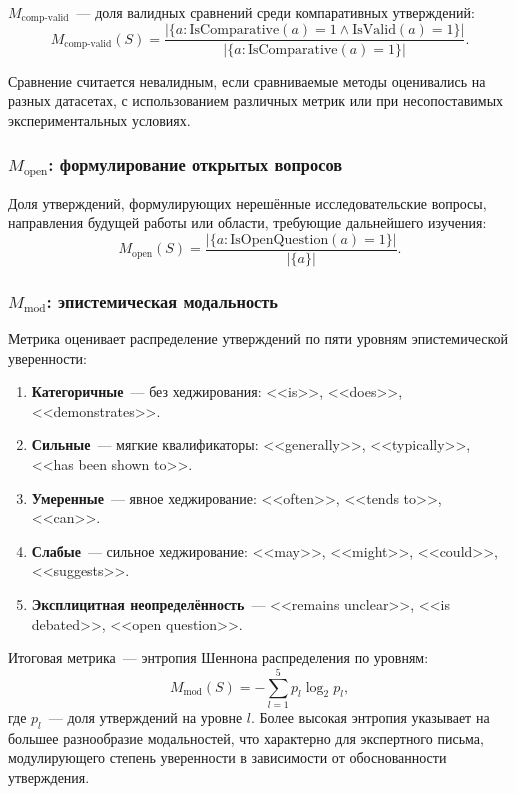 \documentclass[a4paper,14pt]{extarticle}
\begin{document}
$M_\mathrm{comp\text{-}valid}$~--- доля валидных сравнений среди компаративных утверждений:
\begin{equation}
    M_\mathrm{comp\text{-}valid}(S) = \frac{|\{a : \mathrm{IsComparative}(a) = 1 \wedge \mathrm{IsValid}(a) = 1\}|}{|\{a : \mathrm{IsComparative}(a) = 1\}|}.
\end{equation}

Сравнение считается невалидным, если сравниваемые методы оценивались на разных датасетах, с использованием различных метрик или при несопоставимых экспериментальных условиях.


\subsubsection{$M_\mathrm{open}$: формулирование открытых вопросов}

Доля утверждений, формулирующих нерешённые исследовательские вопросы, направления будущей работы или области, требующие дальнейшего изучения:
\begin{equation}
    M_\mathrm{open}(S) = \frac{|\{a : \mathrm{IsOpenQuestion}(a) = 1\}|}{|\{a\}|}.
\end{equation}


\subsubsection{$M_\mathrm{mod}$: эпистемическая модальность}

Метрика оценивает распределение утверждений по пяти уровням эпистемической уверенности:

\begin{enumerate}
    \item \textbf{Категоричные}~--- без хеджирования: <<is>>, <<does>>, <<demonstrates>>.
    \item \textbf{Сильные}~--- мягкие квалификаторы: <<generally>>, <<typically>>, <<has been shown to>>.
    \item \textbf{Умеренные}~--- явное хеджирование: <<often>>, <<tends to>>, <<can>>.
    \item \textbf{Слабые}~--- сильное хеджирование: <<may>>, <<might>>, <<could>>, <<suggests>>.
    \item \textbf{Эксплицитная неопределённость}~--- <<remains unclear>>, <<is debated>>, <<open question>>.
\end{enumerate}

Итоговая метрика~--- энтропия Шеннона распределения по уровням:
\begin{equation}
    M_\mathrm{mod}(S) = -\sum_{l=1}^{5} p_l \log_2 p_l,
\end{equation}
где $p_l$~--- доля утверждений на уровне $l$. Более высокая энтропия указывает на большее разнообразие модальностей, что характерно для экспертного письма, модулирующего степень уверенности в зависимости от обоснованности утверждения.
\end{document}
